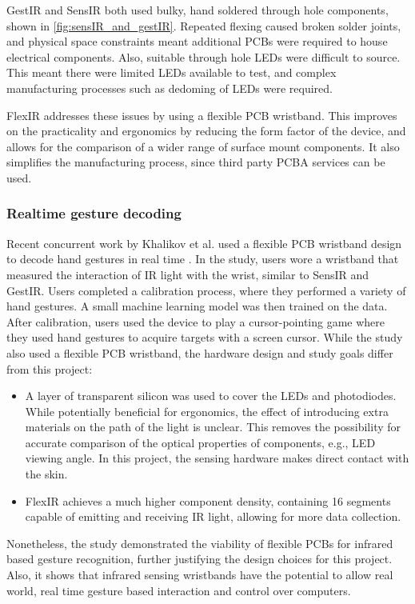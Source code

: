 \documentclass[ oneside,%
                    author={Jack Jarvis},
                    degree={BSc},
                     title={FlexIR: Flexible PCB Wristbands for Infrared Based Gesture Recognition},
                    unit={COMS30045},
                    subtitle={Investigating the Effect of LED Viewing Angle on Gesture Classification in Infrared Sensing Systems}]{dissertation}
\begin{document}
GestIR and SensIR both used bulky, hand soldered through hole components, shown in \autoref{fig:sensIR_and_gestIR}. Repeated flexing caused broken solder joints, and physical space constraints meant additional PCBs were required to house electrical components. Also, suitable through hole LEDs were difficult to source. This meant there were limited LEDs available to test, and complex manufacturing processes such as dedoming of LEDs were required.

FlexIR addresses these issues by using a flexible PCB wristband. This improves on the practicality and ergonomics by reducing the form factor of the device, and allows for the comparison of a wider range of surface mount components. It also simplifies the manufacturing process, since third party PCBA services can be used.

\subsubsection{Realtime gesture decoding}
Recent concurrent work by Khalikov et al. used a flexible PCB wristband design to decode hand gestures in real time \cite{Khalikov2026WearableControl}. In the study, users wore a wristband that measured the interaction of IR light with the wrist, similar to SensIR and GestIR. Users completed a calibration process, where they performed a variety of hand gestures. A small machine learning model was then trained on the data. After calibration, users used the device to play a cursor-pointing game where they used hand gestures to acquire targets with a screen cursor. While the study also used a flexible PCB wristband, the hardware design and study goals differ from this project:
\begin{itemize}
    \item A layer of transparent silicon was used to cover the LEDs and photodiodes. While potentially beneficial for ergonomics, the effect of introducing extra materials on the path of the light is unclear. This removes the possibility for accurate comparison of the optical properties of components, e.g., LED viewing angle. In this project, the sensing hardware makes direct contact with the skin.
    \item FlexIR achieves a much higher component density, containing 16 segments capable of emitting and receiving IR light, allowing for more data collection.
\end{itemize}

Nonetheless, the study demonstrated the viability of flexible PCBs for infrared based gesture recognition, further justifying the design choices for this project. Also, it shows that infrared sensing wristbands have the potential to allow real world, real time gesture based interaction and control over computers.
\end{document}
